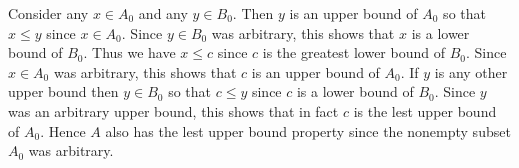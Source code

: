 {{    Consider any $x \in A_0$ and any $y \in B_0$.
    Then $y$ is an upper bound of $A_0$ so that $x \leq y$ since $x \in A_0$.
    Since $y \in B_0$ was arbitrary, this shows that $x$ is a lower bound of $B_0$.
    Thus we have $x \leq c$ since $c$ is the greatest lower bound of $B_0$.
    Since $x \in A_0$ was arbitrary, this shows that $c$ is an upper bound of $A_0$.
    If $y$ is any other upper bound then $y \in B_0$ so that $c \leq y$ since $c$ is a lower bound of $B_0$.
    Since $y$ was an arbitrary upper bound, this shows that in fact $c$ is the lest upper bound of $A_0$.
    Hence $A$ also has the lest upper bound property since the nonempty subset $A_0$ was arbitrary.
  }
}

